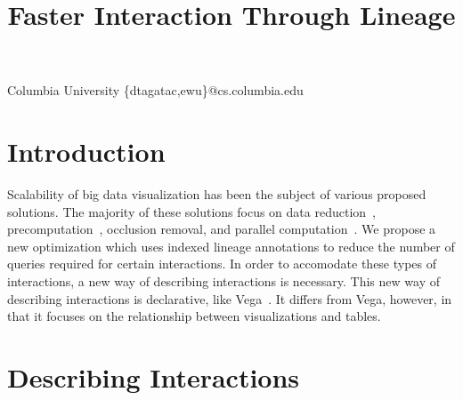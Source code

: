 \documentclass[fleqn]{sigplanconf}
\begin{document}
\setlength{\pdfpageheight}{\paperheight}
\setlength{\pdfpagewidth}{\paperwidth}


\title{Faster Interaction Through Lineage}

           {Columbia University}
           {\{dtagatac,ewu\}@cs.columbia.edu}

\maketitle



\section{Introduction}
Scalability of big data visualization has been the subject of various proposed solutions.
The majority of these solutions focus on data reduction~\cite{Liu2013}, precomputation~\cite{Liu2013}, occlusion removal, and parallel computation~\cite{Liu2013}.
We propose a new optimization which uses indexed lineage annotations to reduce the number of queries required for certain interactions.
In order to accomodate these types of interactions, a new way of describing interactions is necessary.
This new way of describing interactions is declarative, like Vega~\cite{Satyanarayan}.
It differs from Vega, however, in that it focuses on the relationship between visualizations and tables.

\section{Describing Interactions}
\end{document}

